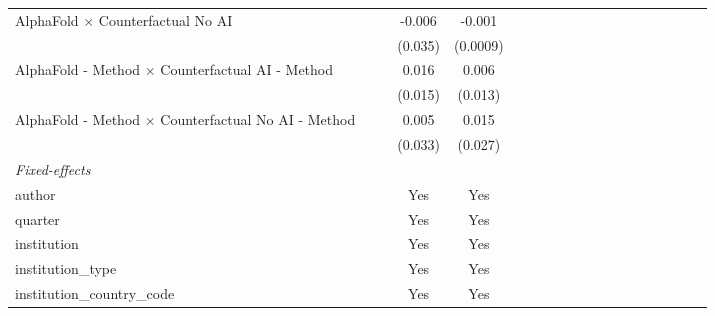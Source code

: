\begin{tabular}{lcccccccccccccccccc}
   AlphaFold $\times$ Counterfactual No AI                    &       &       & -0.006  & -0.001      &       &       &       &       &     &      &      &      &      &      &      &      &      &   \\   
                                                              &       &       & (0.035) & (0.0009)    &       &       &       &       &     &      &      &      &      &      &      &      &      &   \\   
   AlphaFold - Method $\times$ Counterfactual AI - Method     &       &       & 0.016   & 0.006       &       &       &       &       &     &      &      &      &      &      &      &      &      &   \\   
                                                              &       &       & (0.015) & (0.013)     &       &       &       &       &     &      &      &      &      &      &      &      &      &   \\   
   AlphaFold - Method $\times$ Counterfactual No AI - Method  &       &       & 0.005   & 0.015       &       &       &       &       &     &      &      &      &      &      &      &      &      &   \\   
                                                              &       &       & (0.033) & (0.027)     &       &       &       &       &     &      &      &      &      &      &      &      &      &   \\   
   \midrule
   \emph{Fixed-effects}\\
   author                                                     &       &       & Yes     & Yes         &       &       &       &       &     &      &      &      &      &      &      &      &      & \\  
   quarter                                                    &       &       & Yes     & Yes         &       &       &       &       &     &      &      &      &      &      &      &      &      & \\  
   institution                                                &       &       & Yes     & Yes         &       &       &       &       &     &      &      &      &      &      &      &      &      & \\  
   institution\_type                                          &       &       & Yes     & Yes         &       &       &       &       &     &      &      &      &      &      &      &      &      & \\  
   institution\_country\_code                                 &       &       & Yes     & Yes         &       &       &       &       &     &      &      &      &      &      &      &      &      & \\  

\end{tabular}
